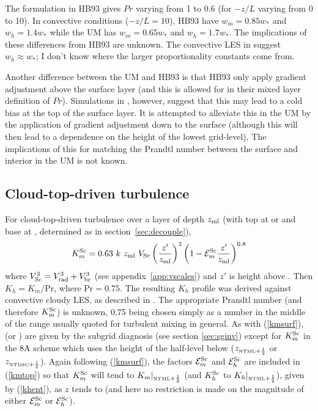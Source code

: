 \documentclass{UMDP_article}
\begin{document}
The formulation in HB93 gives $Pr$ varying from 1 to 0.6 (for $-z/L$
varying from 0 to 10).  In convective conditions ($-z/L=10$), HB93
have $w_m = 0.85 w_*$ and $w_h=1.4 w_*$ while the UM has $w_m = 0.65
w_*$ and $w_h = 1.7 w_*$.  The implications of these differences from
HB93 are unknown.  The convective LES in \cite{lock99} suggest $ w_h
\approx w_*$; I don't know where the larger proportionality constants
come from.

Another difference between the UM and HB93 is that HB93 only apply
gradient adjustment above the surface layer (and this is allowed for
in their mixed layer definition of $Pr$).  Simulations in
\cite{brown1996}, however, suggest that this may lead to a cold bias
at the top of the surface layer.  It is attempted to alleviate this in
the UM by the application of gradient adjustment down to the surface
(although this will then lead to a dependence on the height of the
lowest grid-level).  The implications of this for matching the Prandtl
number between the surface and interior in the UM is not known.

\subsection{Cloud-top-driven turbulence}

For cloud-top-driven turbulence over a layer of depth $z_{\rm ml}$ (with top
at \zh or \zhsc and base at \zbase, determined as in
section~\ref{sec:decouple}),
\begin{equation}
  K_m^{\rm Sc} = 0.63 \ k \ z_{\rm ml} \ V_{\rm Sc} \left( \frac{z'}{z_{\rm ml}} \right)^2
           \left( 1 - {\cal E}_m^{\rm Sc} \frac{z'}{z_{\rm ml}} \right)^{0.8}
  \label{kmtop}
\end{equation}
where $V_{\rm Sc}^3 = V_{\rm rad}^3+V_{\rm br}^3$ (see appendix~\ref{app:vscales}) and $z'$
is height above \zbase.  Then $K_h = K_m / \mbox{Pr}$, where
$\mbox{Pr}=0.75$.  The resulting $K_h$ profile was derived against
convective cloudy LES, as described in \cite{lock99_proceedings}.  The
appropriate Prandtl number (and therefore $K_m^{\rm Sc}$) is unknown, 0.75
being chosen simply as a number in the middle of the range usually
quoted for turbulent mixing in general.  As with (\ref{kmsurf}), \zh
(or \zhsc) are given by the subgrid diagnosis (see section
\ref{sec:sginv}) except for $K_m^{\rm Sc}$ in the 8A scheme which uses the
height of the half-level below ($z_{\mbox{\tiny \rm NTML}+\frac{1}{2}}$ or
$z_{\mbox{\tiny \rm NTDSC}+\frac{1}{2}}$).  Again following (\ref{kmsurf}), the
factors ${\cal E}_m^{\rm Sc}$ and ${\cal E}_h^{\rm Sc}$ are included
in (\ref{kmtop}) so that $K_m^{\rm Sc}$ will tend to
$K_m|_{\mbox{\tiny \rm NTML}+\frac{1}{2}}$ (and $K_h^{\rm Sc}$ to
$K_h|_{\mbox{\tiny \rm NTML}+\frac{1}{2}}$), given by (\ref{khent}), as $z$ tends to
\zh (and here no restriction is made on the magnitude of either ${\cal
  E}_m^{\rm Sc}$ or ${\cal E}_h^{\rm Sc}$).
\end{document}
